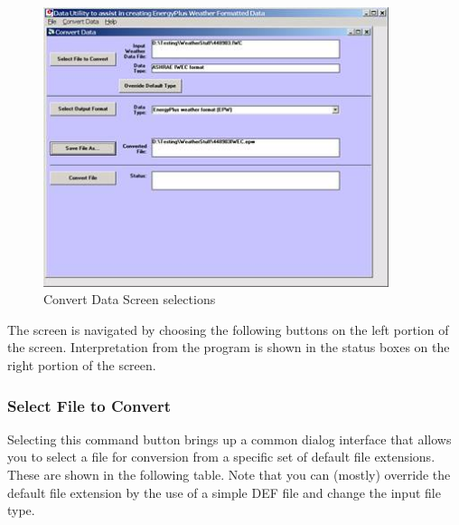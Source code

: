 \begin{figure}[hbtp] %
\centering
\includegraphics[width=0.9\textwidth, height=0.9\textheight, keepaspectratio=true]{media/image003.jpg}
\caption{Convert Data Screen selections \protect \label{fig:convert-data-screen-selections}}
\end{figure}

The screen is navigated by choosing the following buttons on the left portion of the screen. Interpretation from the program is shown in the status boxes on the right portion of the screen.

\subsubsection{Select File to Convert}\label{select-file-to-convert}

Selecting this command button brings up a common dialog interface that allows you to select a file for conversion from a specific set of default file extensions. These are shown in the following table. Note that you can (mostly) override the default file extension by the use of a simple DEF file and change the input file type.

